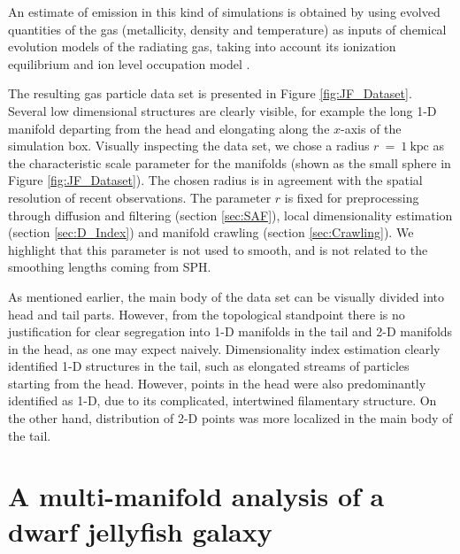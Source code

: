 An estimate of \cii{} emission in  this kind of simulations is obtained by using evolved quantities of the gas (metallicity, density and temperature) as inputs of chemical evolution models of the radiating gas, taking into account its ionization equilibrium and ion level occupation model \citep{Maio2007, DeRijcke2013}.

The resulting gas particle data set is presented in Figure \ref{fig:JF_Dataset}.
Several low dimensional structures are clearly visible, for example the long 1-D manifold departing from the head and elongating along the $x$-axis of the simulation box.
Visually inspecting the data set, we chose a radius $r~=~1~\mathrm{kpc}$ as the characteristic scale parameter for the manifolds (shown as the small sphere in Figure \ref{fig:JF_Dataset}).
The chosen radius is in agreement with the spatial resolution of recent observations.
The parameter $r$ is fixed for preprocessing through diffusion and filtering (section \ref{sec:SAF}), local dimensionality estimation (section \ref{sec:D_Index}) and manifold crawling (section \ref{sec:Crawling}).
We highlight that this parameter is not used to smooth, and is not related to the smoothing lengths coming from SPH.

As mentioned earlier, the main body of the data set can be visually divided into head and tail parts.
However, from the topological standpoint there is no justification for clear segregation into 1-D manifolds in the tail and 2-D manifolds in the head, as one may expect naively.
Dimensionality index estimation clearly identified 1-D structures in the tail, such as elongated streams of particles starting from the head.
However, points in the head were also predominantly identified as 1-D, due to its complicated, intertwined filamentary structure.
On the other hand, distribution of 2-D points was more localized in the main body of the tail.

\section{A multi-manifold analysis of a dwarf jellyfish galaxy}\label{sec:manifold_jellyfish}

